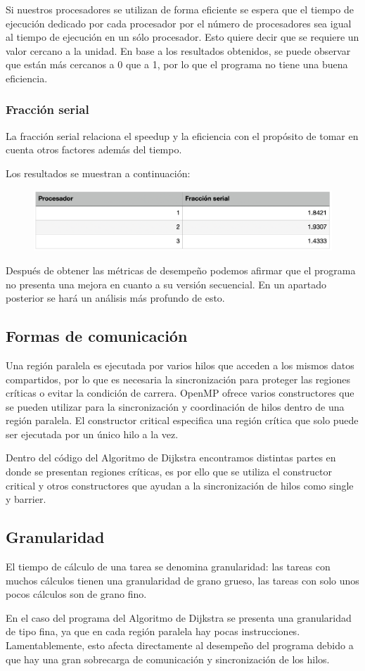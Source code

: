 \documentclass[11pt]{article}
\begin{document}
Si nuestros procesadores se utilizan de forma eficiente se espera que el tiempo de ejecución dedicado por cada procesador por el número de procesadores sea igual al tiempo de ejecución en un sólo procesador. Esto quiere decir que se requiere un valor cercano a la unidad. En base a los resultados obtenidos, se puede observar que están más cercanos a 0 que a 1, por lo que el programa no tiene una buena eficiencia.

\subsubsection{Fracción serial}
La fracción serial relaciona el speedup y la eficiencia con el propósito de tomar en cuenta otros factores además del tiempo.
\par
Los resultados se muestran a continuación:

\begin{figure}[!htbp]
\centering
\includegraphics[scale = .5]{fraccion}
\end{figure}

Después de obtener las métricas de desempeño podemos afirmar que el programa no presenta una mejora en cuanto a su versión secuencial. En un apartado posterior se hará un análisis más profundo de esto.

\subsection{Formas de comunicación}
Una región paralela es ejecutada por varios hilos que acceden a los mismos datos compartidos, por lo que es necesaria la sincronización para proteger las regiones críticas o evitar la condición de carrera. OpenMP ofrece varios constructores que se pueden utilizar para la sincronización y coordinación de hilos dentro de una región paralela. El constructor critical especifica una región crítica que solo puede ser ejecutada por un único hilo a la vez. 
\par
Dentro del código del Algoritmo de Dijkstra encontramos distintas partes en donde se presentan regiones críticas, es por ello que se utiliza el constructor critical y otros constructores que ayudan a la sincronización de hilos como single y barrier.

\subsection{Granularidad}
El tiempo de cálculo de una tarea se denomina granularidad: las tareas con muchos cálculos tienen una granularidad de grano grueso, las tareas con solo unos pocos cálculos son de grano fino. 
\par
En el caso del programa del Algoritmo de Dijkstra se presenta una granularidad de tipo fina, ya que en cada región paralela hay pocas instrucciones. Lamentablemente, esto afecta directamente al desempeño del programa debido a que hay una gran sobrecarga de comunicación y sincronización de los hilos.
\end{document}
